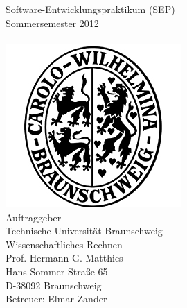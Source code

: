 

\thispagestyle{plain}      %

\begin{titlepage}

\begin{center}

{}\\[2ex]%

{}\\[2ex]%

Software-Entwicklungspraktikum (SEP)\\
Sommersemester 2012\\[4ex]%

{}\\[3ex]%

\includegraphics[scale=0.8]{bilder/carolo.jpg}\\[3ex]%

Auftraggeber\\
Technische Universität Braunschweig\\
Wissenschaftliches Rechnen\\
Prof. Hermann G. Matthies\\
Hans-Sommer-Straße 65\\
D-38092 Braunschweig\\[1ex]%
Betreuer: Elmar Zander\\[3ex]%


\end{center}
\end{titlepage}
